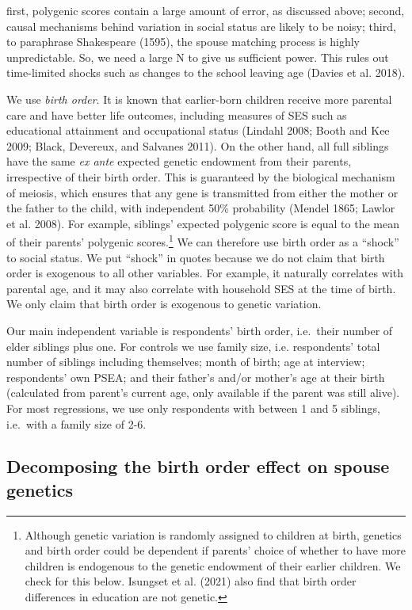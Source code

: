 \documentclass[
]{article}
\theoremstyle{definition}
\theoremstyle{definition}
\theoremstyle{definition}
\theoremstyle{definition}
\theoremstyle{remark}
\begin{document}
 first, polygenic scores contain a large amount of error, as
discussed above; second, causal mechanisms behind variation in social status
are likely to be noisy; third, to paraphrase Shakespeare (1595), the
spouse matching process is highly unpredictable. So, we need a large N to
give us sufficient power. This rules out time-limited shocks such as
changes to the school leaving age (Davies et al. 2018).

We use \emph{birth order}. It is known that earlier-born children receive more
parental care and have better life outcomes, including measures of SES such as
educational attainment and occupational status (Lindahl 2008; Booth and Kee 2009; Black, Devereux, and Salvanes 2011). On the other hand, all full siblings have the same \emph{ex ante}
expected genetic endowment from their parents, irrespective of their birth
order. This is guaranteed by the biological mechanism of meiosis, which ensures
that any gene is transmitted from either the mother or the father to the
child, with independent 50\% probability (Mendel 1865; Lawlor et al. 2008).
For example, siblings' expected polygenic score is equal to the mean of
their parents' polygenic scores.\footnote{Although genetic variation is randomly assigned to children at
  birth, genetics and birth order could be dependent if parents'
  choice of whether to have more children is endogenous to the genetic
  endowment of their earlier children. We check for this below.
  Isungset et al. (2021) also find that birth order differences in education are
  not genetic.} We can therefore use birth order as a
``shock'' to social status. We put ``shock'' in quotes because we do not claim that birth
order is exogenous to all other variables. For example, it naturally correlates
with parental age, and it may also correlate with household SES at the time of
birth. We only claim that birth order is exogenous to genetic variation.

Our main independent variable is respondents' birth order, i.e.~their
number of elder siblings plus one. For controls we use family size, i.e.
respondents' total number of siblings including themselves; month of birth; age
at interview; respondents' own PSEA; and their father's and/or mother's age
at their birth (calculated from parent's current age, only available if
the parent was still alive). For most regressions, we use only
respondents with between 1 and 5 siblings, i.e.~with a family size of
2-6.

\hypertarget{decomposing-the-birth-order-effect-on-spouse-genetics}{%
\subsection{Decomposing the birth order effect on spouse genetics}\label{decomposing-the-birth-order-effect-on-spouse-genetics}}
\end{document}

